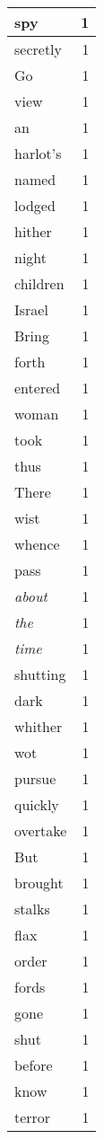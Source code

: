 \begin{center}
\begin{longtable}{l|r}
spy & 1 \\ \hline
secretly & 1 \\ \hline
Go & 1 \\ \hline
view & 1 \\ \hline
an & 1 \\ \hline
harlot's & 1 \\ \hline
named & 1 \\ \hline
lodged & 1 \\ \hline
hither & 1 \\ \hline
night & 1 \\ \hline
children & 1 \\ \hline
Israel & 1 \\ \hline
Bring & 1 \\ \hline
forth & 1 \\ \hline
entered & 1 \\ \hline
woman & 1 \\ \hline
took & 1 \\ \hline
thus & 1 \\ \hline
There & 1 \\ \hline
wist & 1 \\ \hline
whence & 1 \\ \hline
pass & 1 \\ \hline
\emph{about} & 1 \\ \hline
\emph{the} & 1 \\ \hline
\emph{time} & 1 \\ \hline
shutting & 1 \\ \hline
dark & 1 \\ \hline
whither & 1 \\ \hline
wot & 1 \\ \hline
pursue & 1 \\ \hline
quickly & 1 \\ \hline
overtake & 1 \\ \hline
But & 1 \\ \hline
brought & 1 \\ \hline
stalks & 1 \\ \hline
flax & 1 \\ \hline
order & 1 \\ \hline
fords & 1 \\ \hline
gone & 1 \\ \hline
shut & 1 \\ \hline
before & 1 \\ \hline
know & 1 \\ \hline
terror & 1 \\ \hline

\end{longtable}
\end{center}
